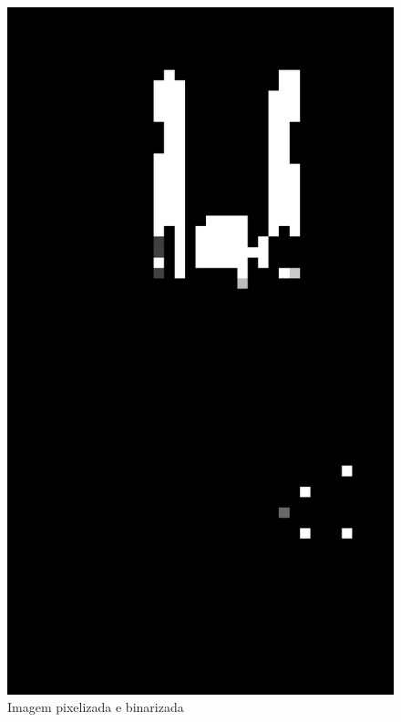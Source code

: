 \begin{figure}[H]
    \centering
    \caption{Imagem pixelizada e binarizada}
        \begin{minipage}{\sizeImg\textwidth}
            \includegraphics[width=\textwidth]{figuras/mao_barra/pixel.png}
        \end{minipage}
        \begin{minipage}{\sizeImg\textwidth}

\end{minipage}
\end{figure}
